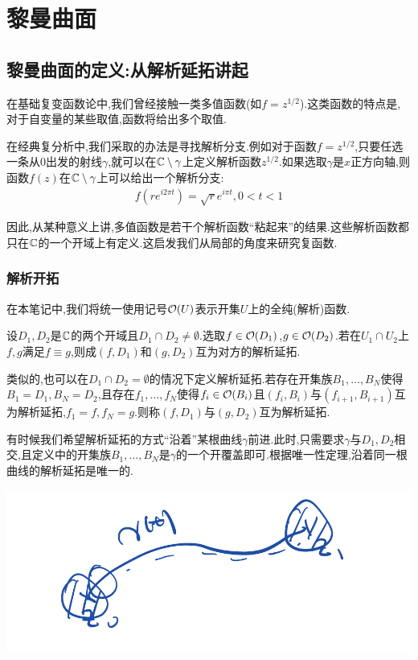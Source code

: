 \ifx\allfiles\undefined

	
	
\else
\fi
\chapter{黎曼曲面}
\section{黎曼曲面的定义:从解析延拓讲起}
在基础复变函数论中,我们曾经接触一类多值函数(如$f=z^{1/2}$).这类函数的特点是,对于自变量的某些取值,函数将给出多个取值.

在经典复分析中,我们采取的办法是寻找解析分支.例如对于函数$f=z^{1/2}$,只要任选一条从$0$出发的射线$\gamma$,就可以在$\mathbb{C} \setminus \gamma$上定义解析函数$z^{1/2}$.如果选取$\gamma$是$x$正方向轴,则函数$f(z)$在$\mathbb{C} \setminus \gamma$上可以给出一个解析分支:
\begin{align*}
	f(r e^{i2\pi t})=\sqrt{r}e^{i\pi t}, 0<t<1
\end{align*}

因此,从某种意义上讲,多值函数是若干个解析函数“粘起来”的结果.这些解析函数都只在$\mathbb{C}$的一个开域上有定义.这启发我们从局部的角度来研究复函数.

\subsection{解析开拓}
在本笔记中,我们将统一使用记号$\mathcal{O}(U)$表示开集$U$上的全纯(解析)函数.
\begin{definition}
	设$D_1,D_2$是$\mathbb{C}$的两个开域且$D_1\cap D_2 \neq \emptyset$.选取$f \in \mathcal{O}(D_1)$,$g \in \mathcal{O}(D_2)$.若在$U_1\cap U_2$上$f,g$满足$f \equiv g$,则成$(f,D_1)$和$(g,D_2)$互为对方的解析延拓.

	类似的,也可以在$D_1\cap D_2=\emptyset$的情况下定义解析延拓.若存在开集族$B_1,\dots,B_N$使得$B_1=D_1,B_N=D_2$,且存在$f_1,\dots,f_N$使得$f_i \in \mathcal{O}(B_i)$且$(f_i,B_i)$与$(f_{i+1},B_{i+1})$互为解析延拓,$f_1=f,f_N=g$.则称$(f,D_1)$与$(g,D_2)$互为解析延拓.
\end{definition}

有时候我们希望解析延拓的方式“沿着”某根曲线$\gamma$前进.此时,只需要求$\gamma$与$D_1,D_2$相交,且定义中的开集族$B_1,\dots,B_N$是$\gamma$的一个开覆盖即可.根据唯一性定理,沿着同一根曲线的解析延拓是唯一的.

\includegraphics[scale=0.25]{resource/extension by lines.png}

